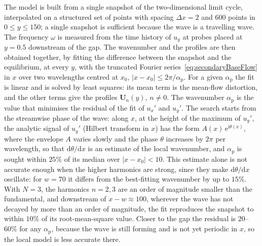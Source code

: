 \documentclass[lineno]{jfm}
\newcommand\awave{{\alpha_\mathrm{p}}} %
\begin{document}
The model is built from a single snapshot of the two-dimensional limit cycle, interpolated on a structured set of points with spacing $\Delta x=2$ and $600$ points in $0\leq y\leq150$; a single snapshot is sufficient because the wave is a travelling wave. The frequency $\omega$ is measured from the time history of $u_y$ at probes placed at $y=0.5$ downstream of the gap. The wavenumber and the profiles are then obtained together, by fitting the difference between the snapshot and the equilibrium, at every $y$, with the truncated Fourier series~\eqref{eq:secondaryBaseFlow} in $x$ over two wavelengths centred at $x_0$, $|x-x_0|\leq2\pi/\awave$. For a given $\awave$ the fit is linear and is solved by least squares: its mean term is the mean-flow distortion, and the other terms give the profiles $\boldsymbol{U}_n(y)$, $n\neq0$. The wavenumber $\awave$ is the value that minimises the residual of the fit of $u_x'$ and $u_y'$. The search starts from the streamwise phase of the wave: along $x$, at the height of the maximum of $u_y'$, the analytic signal of $u_y'$ (Hilbert transform in $x$) has the form $A(x)\,\mathrm{e}^{\mathrm{i}\theta(x)}$, where the envelope $A$ varies slowly and the phase $\theta$ increases by $2\pi$ per wavelength, so that $\mathrm{d}\theta/\mathrm{d}x$ is an estimate of the local wavenumber, and $\awave$ is sought within $25\%$ of its median over $|x-x_0|<10$. This estimate alone is not accurate enough when the higher harmonics are strong, since they make $\mathrm{d}\theta/\mathrm{d}x$ oscillate: for $w=70$ it differs from the best-fitting wavenumber by up to $15\%$. With $N=3$, the harmonics $n=2,3$ are an order of magnitude smaller than the fundamental, and downstream of $x-w\approx100$, wherever the wave has not decayed by more than an order of magnitude, the fit reproduces the snapshot to within $10\%$ of its root-mean-square value. Closer to the gap the residual is $20$--$60\%$ for any $\awave$, because the wave is still forming and is not yet periodic in $x$, so the local model is less accurate there.
\end{document}
